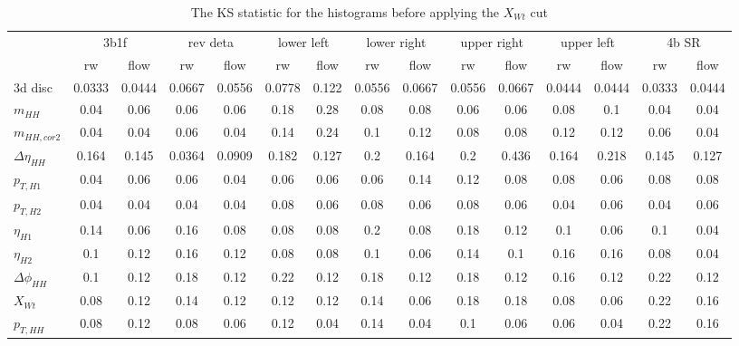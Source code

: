 \begin{table}
\centering\begin{adjustbox}{width=\columnwidth,center}
\label{tab:ks}
\begin{tabular}{lcccccccccccccc}
\toprule
{} & \multicolumn{2}{c}{3b1f} & \multicolumn{2}{c}{rev deta} & \multicolumn{2}{c}{lower left} & \multicolumn{2}{c}{lower right} & \multicolumn{2}{c}{upper right} & \multicolumn{2}{c}{upper left} & \multicolumn{2}{c}{4b SR} \\
{} &     rw &   flow &       rw &   flow &         rw &  flow &          rw &   flow &          rw &   flow &         rw &   flow &     rw &   flow \\
\midrule
3d disc            & 0.0333 & 0.0444 &   0.0667 & 0.0556 &     0.0778 & 0.122 &      0.0556 & 0.0667 &      0.0556 & 0.0667 &     0.0444 & 0.0444 & 0.0333 & 0.0444 \\
$m_{HH}$           &   0.04 &   0.06 &     0.06 &   0.06 &       0.18 &  0.28 &        0.08 &   0.08 &        0.06 &   0.06 &       0.08 &    0.1 &   0.04 &   0.04 \\
$m_{HH,cor2}$      &   0.04 &   0.04 &     0.06 &   0.04 &       0.14 &  0.24 &         0.1 &   0.12 &        0.08 &   0.08 &       0.12 &   0.12 &   0.06 &   0.04 \\
$\Delta \eta_{HH}$ &  0.164 &  0.145 &   0.0364 & 0.0909 &      0.182 & 0.127 &         0.2 &  0.164 &         0.2 &  0.436 &      0.164 &  0.218 &  0.145 &  0.127 \\
$p_{T,H1}$         &   0.04 &   0.06 &     0.06 &   0.04 &       0.06 &  0.06 &        0.06 &   0.14 &        0.12 &   0.08 &       0.08 &   0.06 &   0.08 &   0.08 \\
$p_{T,H2}$         &   0.04 &   0.04 &     0.04 &   0.04 &       0.08 &  0.06 &        0.08 &   0.06 &        0.08 &   0.06 &       0.04 &   0.06 &   0.04 &   0.06 \\
$\eta_{H1}$        &   0.14 &   0.06 &     0.16 &   0.08 &       0.08 &  0.08 &         0.2 &   0.08 &        0.18 &   0.12 &        0.1 &   0.06 &    0.1 &   0.04 \\
$\eta_{H2}$        &    0.1 &   0.12 &     0.16 &   0.12 &       0.08 &  0.08 &         0.1 &   0.06 &        0.14 &    0.1 &       0.16 &   0.16 &   0.08 &   0.04 \\
$\Delta \phi_{HH}$ &    0.1 &   0.12 &     0.18 &   0.12 &       0.22 &  0.12 &        0.18 &   0.12 &        0.18 &   0.12 &       0.16 &   0.12 &   0.22 &   0.12 \\
$X_{Wt}$           &   0.08 &   0.12 &     0.14 &   0.12 &       0.12 &  0.12 &        0.14 &   0.06 &        0.18 &   0.18 &       0.08 &   0.06 &   0.22 &   0.16 \\
$p_{T,HH}$         &   0.08 &   0.12 &     0.08 &   0.06 &       0.12 &  0.04 &        0.14 &   0.04 &         0.1 &   0.06 &       0.06 &   0.04 &   0.22 &   0.16 \\
\bottomrule
\end{tabular}
\end{adjustbox}\caption{The KS statistic for the histograms before applying the $X_{Wt}$ cut}\end{table}
